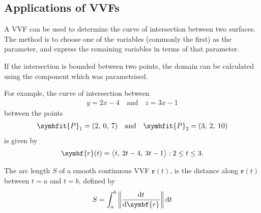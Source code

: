 \documentclass{article}
\begin{document}
\subsection{Applications of VVFs}
\begin{theorem}
    A VVF can be used to determine the curve of intersection between two
    surfaces. The method is to choose one of the variables (commonly the first)
    as the parameter, and express the remaining variables in terms of that parameter.

    If the intersection is bounded between two points, the domain can be
    calculated using the component which was parametrised.

    For example, the curve of intersection between
    \begin{align*}
        y = 2x - 4 \quad \text{and} \quad z = 3x - 1
    \end{align*}
    between the points
    \begin{align*}
        \symbfit{P}_1 = (2,\: 0,\: 7) \quad \text{and} \quad \symbfit{P}_2 = (3,\: 2,\: 10)
    \end{align*}
    is given by
    \begin{equation*}
        \symbf{r}(t) = \avec[\big]{t,\: 2t - 4,\: 3t - 1} : 2 \leq t \leq 3.
    \end{equation*}
\end{theorem}
\begin{definition}
    The arc length $S$ of a smooth continuous VVF $\symbf{r}(t)$, is the distance along $\symbf{r}(t)$
    between $t=a$ and $t=b$, defined by
    \begin{equation*}
        S = \int_a^b \norm{\dv{t}\symbf{r}(t)} \dd{t}
    \end{equation*}
\end{definition}
\newpage
\end{document}
